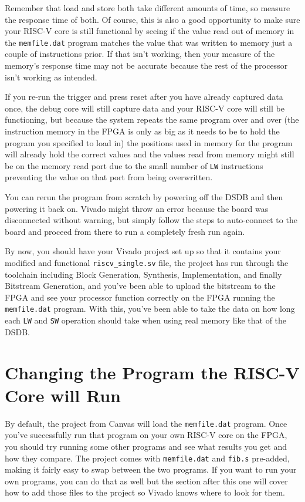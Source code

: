 \documentclass{article}
\begin{document}
\begin{enumerate}
Remember that load and store both take
different amounts of time, so measure the response time of both.  Of course,
this is also a good opportunity to make sure your RISC-V core is still functional
by seeing if the value read out of memory in the \verb|memfile.dat| program
matches the value that was written to memory just a couple of instructions
prior.  If that isn't working, then your measure of the memory's response time
may not be accurate because the rest of the processor isn't working as intended.

If you re-run the trigger and press reset after you have already captured data
once, the debug core will still capture data and your RISC-V core will still be
functioning, but because the system repeats the same program over and over (the
instruction memory in the FPGA is only as big as it needs to be to hold the
program you specified to load in) the positions used in memory for the program
will already hold the correct values and the values read from memory might still
be on the memory read port due to the small number of \verb|LW| instructions
preventing the value on that port from being overwritten.

You can rerun the program from scratch by powering off the DSDB and then
powering it back on.  Vivado might throw an error because the board was
disconnected without warning, but simply follow the steps to auto-connect to the
board and proceed from there to run a completely fresh run again.
\end{enumerate}

By now, you should have your Vivado project set up so that it contains your
modified and functional \verb|riscv_single.sv| file, the project has run through
the toolchain including Block Generation, Synthesis, Implementation, and finally
Bitstream Generation, and you've been able to upload the bitstream to the FPGA
and see your processor function correctly on the FPGA running the
\verb|memfile.dat| program.  With this, you've been able to take the data on how
long each \verb|LW| and \verb|SW| operation should take when using real memory
like that of the DSDB.

\section{Changing the Program the RISC-V Core will Run}

By default, the project from Canvas will load the \verb|memfile.dat| program.
Once you've successfully run that program on your own RISC-V core on the FPGA, you
should try running some other programs and see what results you get and how they
compare.  The project comes with \verb|memfile.dat| and \verb|fib.s| 
pre-added, making it fairly easy to swap between the two programs.  If you want
to run your own programs, you can do that as well but the section after this one
will cover how to add those files to the project so Vivado knows where to look
for them.
\end{document}
